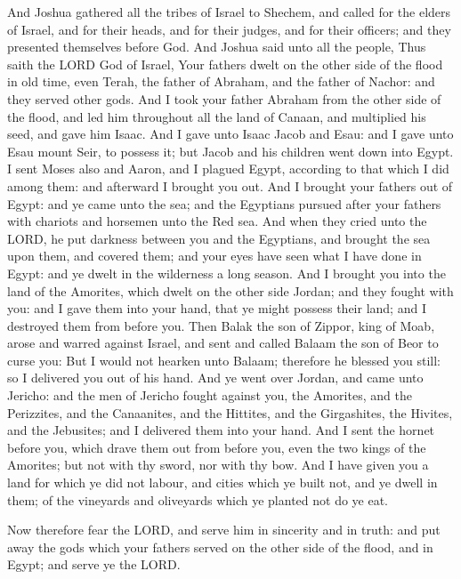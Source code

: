  And Joshua gathered all the tribes of Israel to Shechem,
and called for the elders of Israel, and for their heads, and for their
judges, and for their officers; and they presented themselves before
God.  And Joshua said unto all the people, Thus saith the
LORD God of Israel, Your fathers dwelt on the other side of the flood in
old time, even Terah, the father of Abraham, and the father of Nachor:
and they served other gods.  And I took your father Abraham
from the other side of the flood, and led him throughout all the land of
Canaan, and multiplied his seed, and gave him Isaac.  And I
gave unto Isaac Jacob and Esau: and I gave unto Esau mount Seir, to
possess it; but Jacob and his children went down into Egypt.
 I sent Moses also and Aaron, and I plagued Egypt, according
to that which I did among them: and afterward I brought you out.
 And I brought your fathers out of Egypt: and ye came unto
the sea; and the Egyptians pursued after your fathers with chariots and
horsemen unto the Red sea.  And when they cried unto the
LORD, he put darkness between you and the Egyptians, and brought the sea
upon them, and covered them; and your eyes have seen what I have done in
Egypt: and ye dwelt in the wilderness a long season.  And I
brought you into the land of the Amorites, which dwelt on the other side
Jordan; and they fought with you: and I gave them into your hand, that
ye might possess their land; and I destroyed them from before you.
 Then Balak the son of Zippor, king of Moab, arose and
warred against Israel, and sent and called Balaam the son of Beor to
curse you:  But I would not hearken unto Balaam; therefore
he blessed you still: so I delivered you out of his hand. 
And ye went over Jordan, and came unto Jericho: and the men of Jericho
fought against you, the Amorites, and the Perizzites, and the
Canaanites, and the Hittites, and the Girgashites, the Hivites, and the
Jebusites; and I delivered them into your hand.  And I sent
the hornet before you, which drave them out from before you, even the
two kings of the Amorites; but not with thy sword, nor with thy bow.
 And I have given you a land for which ye did not labour,
and cities which ye built not, and ye dwell in them; of the vineyards
and oliveyards which ye planted not do ye eat.

 Now therefore fear the LORD, and serve him in sincerity
and in truth: and put away the gods which your fathers served on the
other side of the flood, and in Egypt; and serve ye the LORD.

